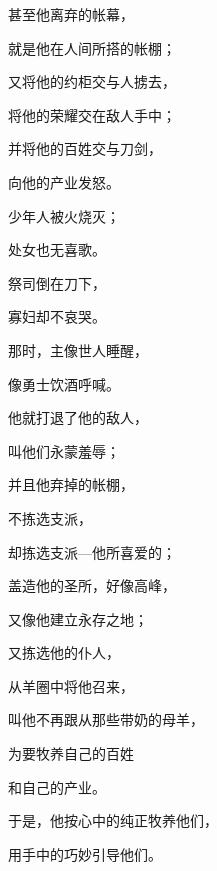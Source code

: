 {\par }{\Q {}甚至他离弃{}的帐幕，
\par }{\Q 就是他在人间所搭的帐棚；
\par }{\Q {}又将他的约柜交与人掳去，
\par }{\Q 将他的荣耀交在敌人手中；
\par }{\Q {}并将他的百姓交与刀剑，
\par }{\Q 向他的产业发怒。
\par }{\Q {}少年人被火烧灭；
\par }{\Q 处女也无喜歌。
\par }{\Q {}祭司倒在刀下，
\par }{\Q 寡妇却不哀哭。
\par }{\BB \par }{\Q {}那时，主像世人睡醒，
\par }{\Q 像勇士饮酒呼喊。
\par }{\Q {}他就打退了他的敌人，
\par }{\Q 叫他们永蒙羞辱；
\par }{\Q {}并且他弃掉{}的帐棚，
\par }{\Q 不拣选{}支派，
\par }{\Q {}却拣选{}支派—他所喜爱的{}；
\par }{\Q {}盖造他的圣所，好像高峰，
\par }{\Q 又像他建立永存之地；
\par }{\Q {}又拣选他的仆人{}，
\par }{\Q 从羊圈中将他召来，
\par }{\Q {}叫他不再跟从那些带奶的母羊，
\par }{\Q 为要牧养自己的百姓{}
\par }{\Q 和自己的产业{}。
\par }{\Q {}于是，他按心中的纯正牧养他们，
\par }{\Q 用手中的巧妙引导他们。

}

